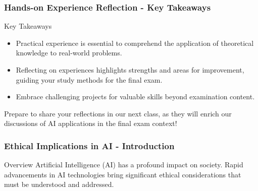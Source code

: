 \documentclass{beamer}
\begin{document}
\begin{frame}[fragile]
    \frametitle{Hands-on Experience Reflection - Key Takeaways}
    \begin{block}{Key Takeaways}
        \begin{itemize}
            \item Practical experience is essential to comprehend the application of theoretical knowledge to real-world problems.
            \item Reflecting on experiences highlights strengths and areas for improvement, guiding your study methods for the final exam.
            \item Embrace challenging projects for valuable skills beyond examination content.
        \end{itemize}
    \end{block}
    Prepare to share your reflections in our next class, as they will enrich our discussions of AI applications in the final exam context!
\end{frame}

\begin{frame}[fragile]
    \frametitle{Ethical Implications in AI - Introduction}
    \begin{block}{Overview}
        Artificial Intelligence (AI) has a profound impact on society. Rapid advancements in AI technologies bring significant ethical considerations that must be understood and addressed.
    \end{block}
\end{frame}
\end{document}
